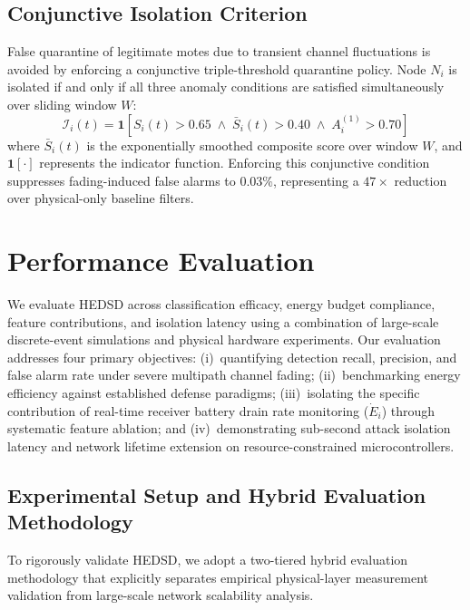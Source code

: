 \documentclass[conference]{IEEEtran}
\begin{document}
\subsection{Conjunctive Isolation Criterion}
False quarantine of legitimate motes due to transient channel fluctuations is avoided by enforcing a conjunctive triple-threshold quarantine policy. Node $N_i$ is isolated if and only if all three anomaly conditions are satisfied simultaneously over sliding window $W$:
\begin{equation}
\mathcal{I}_i(t) = \mathbf{1}\left[ S_i(t) > 0.65 \;\land\; \bar{S}_i(t) > 0.40 \;\land\; A_i^{(1)} > 0.70 \right]
\label{eq:isolate}
\end{equation}
where $\bar{S}_i(t)$ is the exponentially smoothed composite score over window $W$, and $\mathbf{1}[\cdot]$ represents the indicator function. Enforcing this conjunctive condition suppresses fading-induced false alarms to $0.03\%$, representing a $47\times$ reduction over physical-only baseline filters.

\section{Performance Evaluation}
\label{sec:eval}

We evaluate HEDSD across classification efficacy, energy budget compliance, feature contributions, and isolation latency using a combination of large-scale discrete-event simulations and physical hardware experiments. Our evaluation addresses four primary objectives: (i)~quantifying detection recall, precision, and false alarm rate under severe multipath channel fading; (ii)~benchmarking energy efficiency against established defense paradigms; (iii)~isolating the specific contribution of real-time receiver battery drain rate monitoring ($\dot{E}_i$) through systematic feature ablation; and (iv)~demonstrating sub-second attack isolation latency and network lifetime extension on resource-constrained microcontrollers.

\subsection{Experimental Setup and Hybrid Evaluation Methodology}
To rigorously validate HEDSD, we adopt a two-tiered hybrid evaluation methodology that explicitly separates empirical physical-layer measurement validation from large-scale network scalability analysis.
\end{document}
